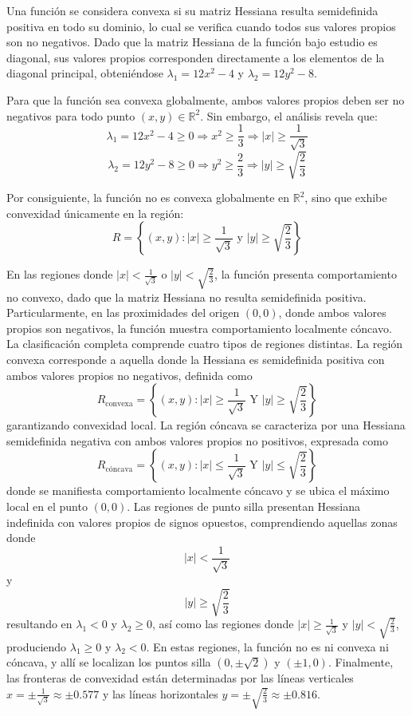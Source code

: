 \documentclass[12pt,a4paper]{article}
\begin{document}
Una función se considera convexa si su matriz Hessiana resulta semidefinida positiva en todo su dominio, lo cual se verifica cuando todos sus valores propios son no negativos. Dado que la matriz Hessiana de la función bajo estudio es diagonal, sus valores propios corresponden directamente a los elementos de la diagonal principal, obteniéndose $\lambda_1 = 12x^2 - 4$ y $\lambda_2 = 12y^2 - 8$.

Para que la función sea convexa globalmente, ambos valores propios deben ser no negativos para todo punto $(x,y) \in \mathbb{R}^2$. Sin embargo, el análisis revela que:
\[\lambda_1 = 12x^2 - 4 \geq 0 \Rightarrow x^2 \geq \frac{1}{3} \Rightarrow |x| \geq \frac{1}{\sqrt{3}}\]
\[\lambda_2 = 12y^2 - 8 \geq 0 \Rightarrow y^2 \geq \frac{2}{3} \Rightarrow |y| \geq \sqrt{\frac{2}{3}}\]

Por consiguiente, la función no es convexa globalmente en $\mathbb{R}^2$, sino que exhibe convexidad únicamente en la región:
\[R = \left\{(x,y) : |x| \geq \frac{1}{\sqrt{3}} \text{ y } |y| \geq \sqrt{\frac{2}{3}}\right\}\]

En las regiones donde $|x| < \frac{1}{\sqrt{3}}$ o $|y| < \sqrt{\frac{2}{3}}$, la función presenta comportamiento no convexo, dado que la matriz Hessiana no resulta semidefinida positiva. Particularmente, en las proximidades del origen $(0,0)$, donde ambos valores propios son negativos, la función muestra comportamiento localmente cóncavo. La clasificación completa comprende cuatro tipos de regiones distintas. La región convexa corresponde a aquella donde la Hessiana es semidefinida positiva con ambos valores propios no negativos, definida como
\[R_{\text{convexa}} = \left\{(x,y) : |x| \geq \frac{1}{\sqrt{3}} \text{ Y } |y| \geq \sqrt{\frac{2}{3}}\right\}\]
garantizando convexidad local. La región cóncava se caracteriza por una Hessiana semidefinida negativa con ambos valores propios no positivos, expresada como
\[R_{\text{cóncava}} = \left\{(x,y) : |x| \leq \frac{1}{\sqrt{3}} \text{ Y } |y| \leq \sqrt{\frac{2}{3}}\right\}\]
donde se manifiesta comportamiento localmente cóncavo y se ubica el máximo local en el punto $(0,0)$. Las regiones de punto silla presentan Hessiana indefinida con valores propios de signos opuestos, comprendiendo aquellas zonas donde
\[|x| < \frac{1}{\sqrt{3}}\]
y
\[|y| \geq \sqrt{\frac{2}{3}}\]
resultando en $\lambda_1 < 0$ y $\lambda_2 \geq 0$, así como las regiones donde $|x| \geq \frac{1}{\sqrt{3}}$ y $|y| < \sqrt{\frac{2}{3}}$, produciendo $\lambda_1 \geq 0$ y $\lambda_2 < 0$. En estas regiones, la función no es ni convexa ni cóncava, y allí se localizan los puntos silla $(0, \pm\sqrt{2})$ y $(\pm 1, 0)$. Finalmente, las fronteras de convexidad están determinadas por las líneas verticales $x = \pm\frac{1}{\sqrt{3}} \approx \pm 0.577$ y las líneas horizontales $y = \pm\sqrt{\frac{2}{3}} \approx \pm 0.816$.
\end{document}
